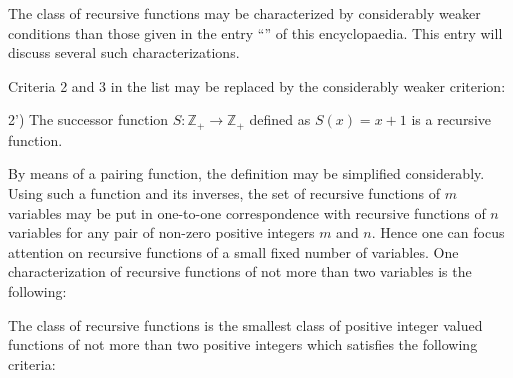 \documentclass[12pt]{article}
\begin{document}
The class of recursive functions may be characterized by considerably weaker conditions than those given in the entry ``'' of this encyclopaedia.  This entry will discuss several such characterizations.

Criteria 2 and 3 in the list may be replaced by the considerably weaker criterion:

2') The successor function $S \colon \mathbb{Z}_+ \to \mathbb{Z}_+$ defined as $S(x) = x+1$ is a recursive function.

By means of a pairing function, the definition may be simplified considerably.   Using such a function and its inverses, the set of recursive functions of $m$ variables may be put in one-to-one correspondence with recursive functions of $n$ variables for any pair of non-zero positive integers $m$ and $n$.  Hence one can focus attention on recursive functions of a small fixed number of variables.  One characterization of recursive functions of not more than two variables is the following:

The class of recursive functions is the smallest class of positive integer valued functions of not more than two positive integers which satisfies the following criteria:
\end{document}
